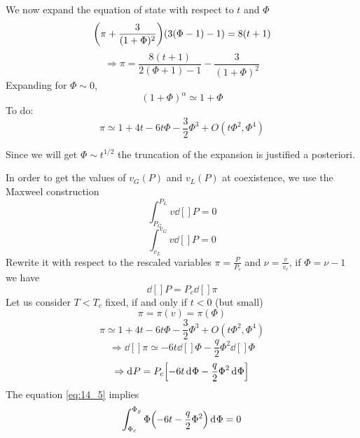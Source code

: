 \documentclass[../main/main.tex]{subfiles}
\begin{document}
We now expand the equation of state with respect to \( t \) and \( \Phi  \)
\begin{equation}
  \qty(\pi + \frac{3}{(1+\Phi )^2}) \qty(3 (\Phi -1) -1) = 8 (t+1)
\end{equation}
\begin{equation}
  \Rightarrow \pi = \frac{8(t+1)}{2(\Phi +1)-1} - \frac{3}{(1+\Phi )^2}
\end{equation}
Expanding for \( \Phi \sim 0 \),
\begin{equation}
  (1+\Phi )^ \alpha \simeq 1 + \Phi
\end{equation}
To do:
\begin{equation}
  \pi \simeq 1 + 4 t - 6 t \Phi - \frac{3}{2} \Phi ^3 + O (t \Phi ^2,\Phi ^4)
\end{equation}
\begin{remark}
Since we will get \( \Phi \sim t^{1/2} \) the truncation of the expansion is justified a posteriori.
\end{remark}
In order to get the values of \( v_G (P) \) and \( v_L (P) \) at coexistence, we use the Maxweel construction
\begin{equation}
  \int_{P_G}^{P_L} v\dd[]{P} = 0
\end{equation}
\begin{equation}
  \int_{v_L}^{v_G} v\dd[]{P} = 0
  \label{eq:14_5}
\end{equation}
Rewrite it with respect to the rescaled variables \( \pi = \frac{P}{P_c} \) and \( \nu = \frac{v}{v_c} \), if \( \Phi = \nu -1 \)  we have
\begin{equation}
  \dd[]{P} = P_c \dd[]{\pi }
\end{equation}
Let us consider \( T < T_c \) fixed, if and only if \( t<0 \) (but small)
\begin{equation}
  \pi = \pi (v) = \pi (\Phi )
\end{equation}
\begin{equation}
  \pi \simeq 1 + 4 t - 6 t \Phi - \frac{3}{2} \Phi ^3 + O (t \Phi ^2, \Phi ^4)
\end{equation}
\begin{equation}
  \Rightarrow \dd[]{\pi} \simeq - 6 t \dd[]{\Phi } - \frac{q}{2} \Phi ^2 \dd[]{\Phi }
\end{equation}
\begin{equation}
  \Rightarrow \dd[]{P} = P_c \qty[-6t \dd[]{\Phi } - \frac{q}{2} \Phi ^2 \dd[]{\Phi }  ]
\end{equation}
The equation \eqref{eq:14_5} implies
\begin{equation}
  \int_{\Phi _c}^{\Phi _g} \Phi \qty(-6t - \frac{q}{2} \Phi ^2) \dd[]{\Phi }  = 0
\end{equation}
\end{document}
